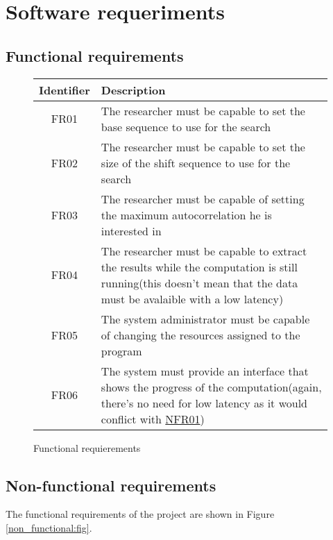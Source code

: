 \section{Software requeriments}


\subsection{Functional requirements}

\begin{figure}

  \begin{center}
    \begin{tabular}{||c | p{10cm}||}
      \hline
      Identifier & Description \\
      \hline
      \hline
      FR01 \label{FR01} & The researcher must be capable to set the base
      sequence to use for the search \\
      \hline
      FR02 \label{FR02} & The researcher must be capable to set the size
      of the shift sequence to use for the search\\
      \hline
      FR03 \label{FR03} & The researcher must be capable of setting the maximum
      autocorrelation he is interested in \\
      \hline
      FR04 \label{FR04} & The researcher must be capable to extract the
      results while the computation is still running(this doesn't mean that
      the data must be avalaible with a low latency)\\
      \hline
      FR05 \label{FR05} & The system administrator must be capable of changing
      the resources assigned to the program\\
      \hline
      FR06 \label{FR06} & The system must provide an interface that shows
      the progress of the computation(again, there's no need for low latency
      as it would conflict with \hyperref[NFR01]{NFR01})\\
      \hline
    \end{tabular}
  \end{center}

  \caption{Functional requierements}
  \label{functional:fig}
\end{figure}

\subsection{Non-functional requirements}

The functional requirements of the project are shown in Figure
\ref{non_functional:fig}.

